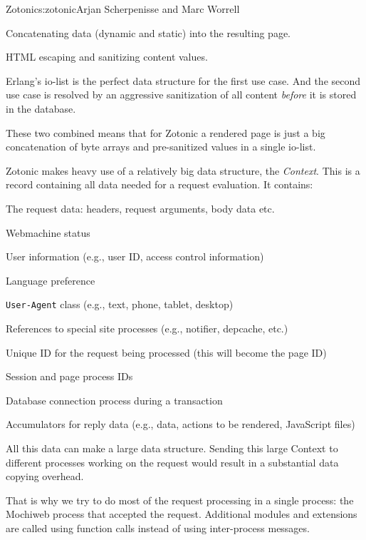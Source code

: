 \begin{aosachapter}{Zotonic}{s:zotonic}{Arjan Scherpenisse and Marc Worrell}
\begin{aosaenumerate}
\def\labelenumi{\arabic{enumi}.}

\item
  Concatenating data (dynamic and static) into the resulting page.
\item
  HTML escaping and sanitizing content values.
\end{aosaenumerate}

Erlang's io-list is the perfect data structure for the first use case.
And the second use case is resolved by an aggressive sanitization of all
content \emph{before} it is stored in the database.

These two combined means that for Zotonic a rendered page is just a big
concatenation of byte arrays and pre-sanitized values in a single
io-list.


Zotonic makes heavy use of a relatively big data structure, the
\emph{Context}. This is a record containing all data needed for a
request evaluation. It contains:

\begin{aosaitemize}

\item
  The request data: headers, request arguments, body data etc.
\item
  Webmachine status
\item
  User information (e.g., user ID, access control information)
\item
  Language preference
\item
  \texttt{User-Agent} class (e.g., text, phone, tablet, desktop)
\item
  References to special site processes (e.g., notifier, depcache, etc.)
\item
  Unique ID for the request being processed (this will become the page
  ID)
\item
  Session and page process IDs
\item
  Database connection process during a transaction
\item
  Accumulators for reply data (e.g., data, actions to be rendered,
  JavaScript files)
\end{aosaitemize}

All this data can make a large data structure. Sending this large
Context to different processes working on the request would result in a
substantial data copying overhead.

That is why we try to do most of the request processing in a single
process: the Mochiweb process that accepted the request. Additional
modules and extensions are called using function calls instead of using
inter-process messages.


\end{aosachapter}

